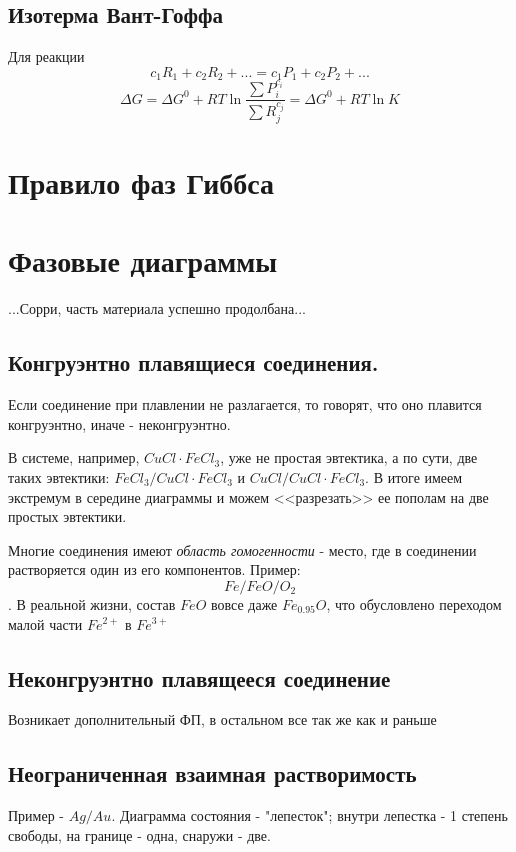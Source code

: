\documentclass[11pt]{article}
\begin{document}
\subsection{Изотерма Вант-Гоффа}
Для реакции 
$$c_1R_1 + c_2R_2 +... = c_1P_1 + c_2P_2 +...$$
$$\Delta G = \Delta G^0 + RT \ln \frac{\sum P_i^{c_i}}{\sum R_j^{c_j}} = \Delta G^0 + RT \ln K$$





\section{Правило фаз Гиббса}

\section{Фазовые диаграммы}

...Сорри, часть материала успешно продолбана...

\subsection{Конгруэнтно плавящиеся соединения.}
Если соединение при плавлении не разлагается, то говорят, что оно плавится конгруэнтно, иначе - неконгруэнтно.

В системе, например, $CuCl\cdot FeCl_3$, уже не простая эвтектика, а по сути, две таких эвтектики: $FeCl_3/CuCl\cdot FeCl_3$ и $CuCl/CuCl\cdot FeCl_3$. В итоге имеем экстремум в середине диаграммы и можем <<разрезать>> ее пополам на две простых эвтектики.

Многие соединения имеют \emph{область гомогенности} - место, где в соединении растворяется один из его компонентов. Пример: $$Fe/FeO/O_2$$. В реальной жизни, состав $FeO$ вовсе даже $Fe_{0.95}O$, что обусловлено переходом малой части $Fe^{2+}$ в $Fe^{3+}$

\subsection{Неконгруэнтно плавящееся соединение}
Возникает дополнительный ФП, в остальном все так же как и раньше
\subsection{Неограниченная взаимная растворимость}
Пример - $Ag/Au$. Диаграмма состояния - "лепесток"; внутри лепестка - 1 степень свободы, на границе - одна, снаружи - две.
\end{document}
